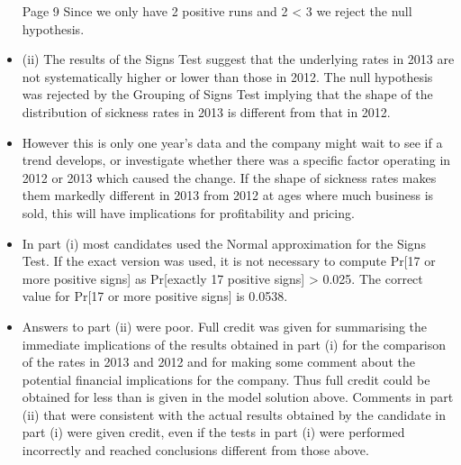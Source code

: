 \documentclass[a4paper,12pt]{article}
\begin{document}
\begin{itemize}
Page 9 %
Since we only have 2 positive runs and 2 < 3 we reject the null hypothesis.
\item (ii)
The results of the Signs Test suggest that the underlying rates in 2013 are not
systematically higher or lower than those in 2012.
The null hypothesis was rejected by the Grouping of Signs Test implying
that the shape of the distribution of sickness rates in 2013 is different from
that in 2012.
\item However this is only one year’s data and the company might wait to see if a
trend develops, or investigate whether there was a specific factor operating in
2012 or 2013 which caused the change.
If the shape of sickness rates makes them markedly different in 2013 from
2012 at ages where much business is sold, this will have implications for
profitability and pricing.
\item In part (i) most candidates used the Normal approximation for the Signs Test. If the exact
version was used, it is not necessary to compute Pr[17 or more positive signs] as Pr[exactly
17 positive signs] > 0.025. The correct value for Pr[17 or more positive signs] is 0.0538.

\item Answers to part (ii) were poor. Full credit was given for summarising the immediate
implications of the results obtained in part (i) for the comparison of the rates in 2013 and
2012 and for making some comment about the potential financial implications for the
company. Thus full credit could be obtained for less than is given in the model solution
above. Comments in part (ii) that were consistent with the actual results obtained by the
candidate in part (i) were given credit, even if the tests in part (i) were performed incorrectly
and reached conclusions different from those above.
\end{itemize}
\end{document}
